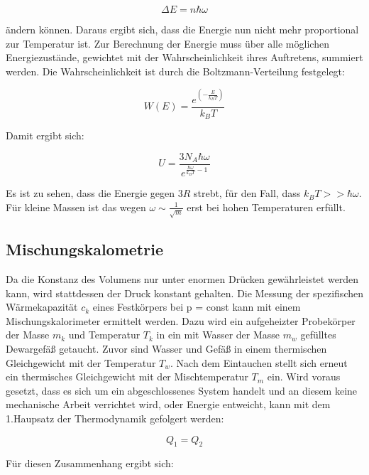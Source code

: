 \begin{equation*}
\Delta E = n \hbar \omega
\end{equation*}

ändern können. Daraus ergibt sich, dass die Energie nun
nicht mehr proportional zur Temperatur ist.
Zur Berechnung der Energie muss über alle möglichen 
Energiezustände, gewichtet mit der Wahrscheinlichkeit
ihres Auftretens, summiert werden. Die Wahrscheinlichkeit
ist durch die Boltzmann-Verteilung festgelegt: 

\begin{equation*}
W(E) = \frac{e^{\left(-\frac{E}{k_B T}\right)}}{k_B T}
\end{equation*}

Damit ergibt sich:

\begin{equation*}
U = \frac{3 N_A \hbar \omega}{e^{\frac{\hbar \omega}{k_B T} - 1}}
\end{equation*}

Es ist zu sehen, dass die Energie gegen $3R$ strebt, für den
Fall, dass $k_B T >> \hbar \omega$. Für kleine Massen ist das
wegen $\omega \sim \frac{1}{\sqrt{m}}$ erst bei 
hohen Temperaturen erfüllt. 

\subsection{Mischungskalometrie}

Da die Konstanz des Volumens nur unter enormen Drücken 
gewährleistet werden kann, wird stattdessen der Druck 
konstant gehalten. 
Die Messung der spezifischen Wärmekapazität $c_k$ eines 
Festkörpers bei p = const kann mit einem Mischungskalorimeter
ermittelt werden.
Dazu wird ein aufgeheizter Probekörper der Masse $m_k$ und 
Temperatur $T_k$ in ein mit Wasser der Masse $m_w$ gefülltes 
Dewargefäß getaucht. Zuvor sind Wasser und Gefäß in einem
thermischen Gleichgewicht mit der Temperatur $T_w$. 
Nach dem Eintauchen stellt sich erneut ein thermisches 
Gleichgewicht mit der Mischtemperatur $T_m$ ein. 
Wird voraus gesetzt, dass es sich um ein abgeschlossenes 
System handelt und an diesem keine mechanische Arbeit 
verrichtet wird, oder Energie entweicht, kann mit dem
1.Haupsatz der Thermodynamik gefolgert werden:

\begin{equation*}
Q_1 = Q_2
\end{equation*}

Für diesen Zusammenhang ergibt sich: 

